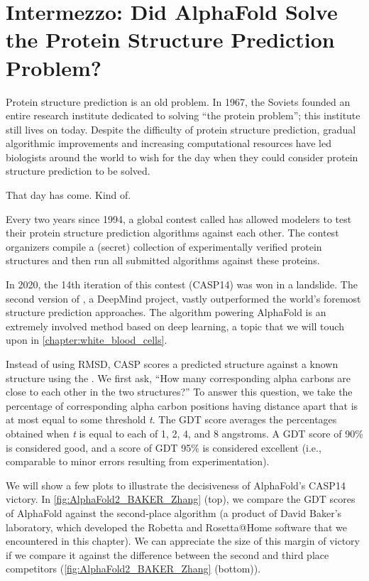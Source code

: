 
\section{Intermezzo: Did AlphaFold Solve the Protein Structure Prediction Problem?}
\label{sec:intermezzo}

Protein structure prediction is an old problem. In 1967, the Soviets founded an entire research institute dedicated to solving ``the protein problem''; this institute still lives on today. Despite the difficulty of protein structure prediction, gradual algorithmic improvements and increasing computational resources have led biologists around the world to wish for the day when they could consider protein structure prediction to be solved.

That day has come. Kind of.

Every two years since 1994, a global contest called  has allowed modelers to test their protein structure prediction algorithms against each other. The contest organizers compile a (secret) collection of experimentally verified protein structures and then run all submitted algorithms against these proteins.

In 2020, the 14th iteration of this contest (CASP14) was won in a landslide. The second version of \href{https://bit.ly/3sKl6pH}{}, a DeepMind project, vastly outperformed the world's foremost structure prediction approaches. The algorithm powering AlphaFold is an extremely involved method based on deep learning, a topic that we will touch upon in \autoref{chapter:white_blood_cells}.

Instead of using RMSD, CASP scores a predicted structure against a known structure using the . We first ask, ``How many corresponding alpha carbons are close to each other in the two structures?'' To answer this question, we take the percentage of corresponding alpha carbon positions having distance apart that is at most equal to some threshold \textit{t}. The GDT score averages the percentages obtained when \textit{t} is equal to each of 1, 2, 4, and 8 angstroms. A GDT score of 90\% is considered good, and a score of GDT 95\% is considered excellent (i.e., comparable to minor errors resulting from experimentation).

We will show a few plots to illustrate the decisiveness of AlphaFold's CASP14 victory. In \autoref{fig:AlphaFold2_BAKER_Zhang} (top), we compare the GDT scores of AlphaFold against the second-place algorithm (a product of David Baker's laboratory, which developed the Robetta and Rosetta@Home software that we encountered in this chapter). We can appreciate the size of this margin of victory if we compare it against the difference between the second and third place competitors (\autoref{fig:AlphaFold2_BAKER_Zhang} (bottom)).\\


